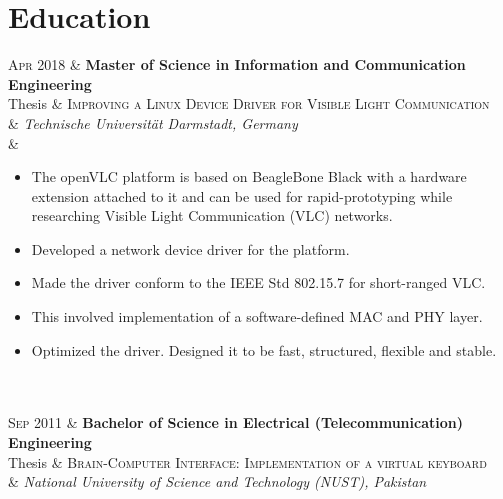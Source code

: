 \documentclass[a4paper,10pt]{article}
\makeatletter
\newcommand*{\bulletfontstyle}[1]{\fontsize{8.5pt}{1em}\selectfont\color{mycustom} #1}
\newcommand{\addeducation}[5]{%
\textsc{#1} & \textbf{#2}\\
Thesis & \textsc{#4}\\
& \emph{#3}
#5%
}
\newenvironment{mainevn}{%
\vspace{2mm}
\tabularx{\linewidth}{>{\raggedleft\arraybackslash\hsize=0.25\hsize}X@{\hspace{2mm}}|@{\hspace{1mm}}>{\hsize=1.75\hsize}X}}
{\endtabularx\vspace{8mm}}
\makeatother
\begin{document}
\begin{minipage}[c]{0.67\textwidth}
\section{Education}
\begin{mainevn}
\addeducation{Apr 2018}%
{Master of Science in Information and Communication Engineering}%
{Technische Universität Darmstadt, Germany}%
{Improving a Linux Device Driver for Visible Light Communication}%
{\\ & \begin{minipage}{0.84\textwidth}
\begin{itemize}
\bulletfontstyle{%
\item The openVLC platform is based on BeagleBone Black with a hardware extension attached to it and can be used for rapid-prototyping while researching Visible Light Communication (VLC) networks.
\item Developed a network device driver for the platform.
\item Made the driver conform to the IEEE Std 802.15.7 for short-ranged VLC.
\item This involved implementation of a software-defined MAC and PHY layer. 
\item Optimized the driver. Designed it to be fast, structured, flexible and stable.%
}%
\end{itemize}
\end{minipage}
}
\\ \\%

\addeducation{Sep 2011}%
{Bachelor of Science in Electrical (Telecommunication) Engineering}%
{National University of Science and Technology (NUST), Pakistan}%
{Brain-Computer Interface: Implementation of a virtual keyboard}%
{\\}
\end{mainevn}


\end{minipage}
\end{document}
